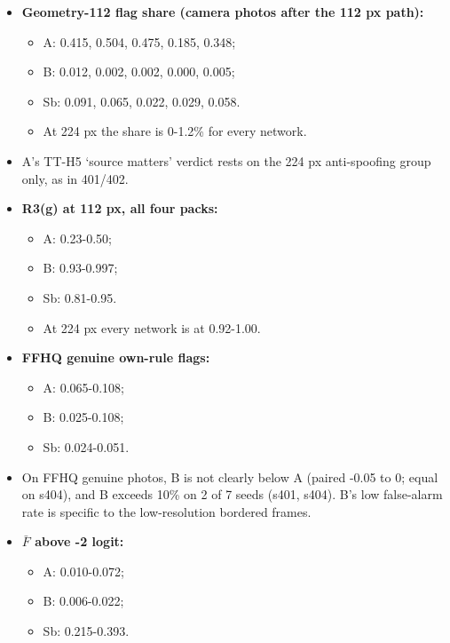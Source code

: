 \documentclass[10pt,twocolumn,letterpaper]{article}
\providecommand{\tightlist}{\setlength{\itemsep}{0pt}\setlength{\parskip}{0pt}}
\begin{document}
\begin{itemize}
\tightlist
\item
  \textbf{Geometry-112 flag share (camera photos after the 112 px path):}

  \begin{itemize}
  \tightlist
  \item
    A: 0.415, 0.504, 0.475, 0.185, 0.348;
  \item
    B: 0.012, 0.002, 0.002, 0.000, 0.005;
  \item
    Sb: 0.091, 0.065, 0.022, 0.029, 0.058.
  \item
    At 224 px the share is 0-1.2\% for every network.
  \end{itemize}
\item
  A's TT-H5 `source matters' verdict rests on the 224 px anti-spoofing group only, as in 401/402.
\item
  \textbf{R3(g) at 112 px, all four packs:}

  \begin{itemize}
  \tightlist
  \item
    A: 0.23-0.50;
  \item
    B: 0.93-0.997;
  \item
    Sb: 0.81-0.95.
  \item
    At 224 px every network is at 0.92-1.00.
  \end{itemize}
\item
  \textbf{FFHQ genuine own-rule flags:}

  \begin{itemize}
  \tightlist
  \item
    A: 0.065-0.108;
  \item
    B: 0.025-0.108;
  \item
    Sb: 0.024-0.051.
  \end{itemize}
\item
  On FFHQ genuine photos, B is not clearly below A (paired -0.05 to 0; equal on s404), and B exceeds 10\% on 2 of 7 seeds (s401, s404). B's low false-alarm rate is specific to the low-resolution bordered frames.
\item
  \textbf{\(\bar F\) above -2 logit:}

  \begin{itemize}
  \tightlist
  \item
    A: 0.010-0.072;
  \item
    B: 0.006-0.022;
  \item
    Sb: 0.215-0.393.
  \end{itemize}
\end{itemize}
\end{document}
